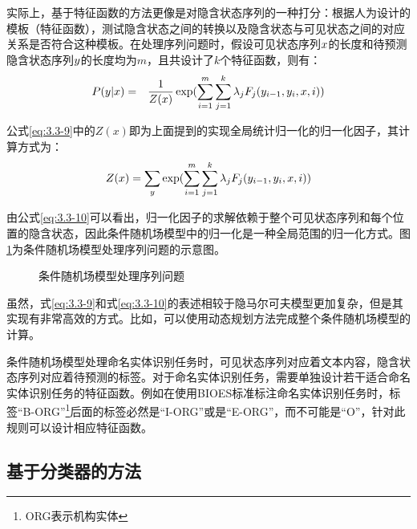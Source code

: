 \parinterval 实际上，基于特征函数的方法更像是对隐含状态序列的一种打分：根据人为设计的模板（特征函数），测试隐含状态之间的转换以及隐含状态与可见状态之间的对应关系是否符合这种模板。在处理序列问题时，假设可见状态序列${x}$的长度和待预测隐含状态序列${y}$的长度均为$m$，且共设计了$k$个特征函数，则有：
\begin{eqnarray}
{P}({y}|{x}) & = & \frac{1}{Z({x})}\exp(\sum_{i=1}^m\sum_{j=1}^{k}\lambda_{j}F_{j}(y_{i-1},y_i,{x},i))
\label{eq:3.3-9}
\end{eqnarray}

\parinterval 公式\eqref{eq:3.3-9}中的$Z(x)$即为上面提到的实现全局统计归一化的归一化因子，其计算方式为：
\begin{eqnarray}
Z({x})=\sum_{{y}}\exp(\sum_{i=1}^m\sum_{j=1}^k\lambda_{j}F_{j}(y_{i-1},y_i,{x},i))
\label{eq:3.3-10}
\end{eqnarray}

\parinterval 由公式\eqref{eq:3.3-10}可以看出，归一化因子的求解依赖于整个可见状态序列和每个位置的隐含状态，因此条件随机场模型中的归一化是一种全局范围的归一化方式。图\ref{fig:3.3-6}为条件随机场模型处理序列问题的示意图。

\begin{figure}[htp]
\centering

\caption{条件随机场模型处理序列问题}
\label{fig:3.3-6}
\end{figure}

\parinterval 虽然，式\eqref{eq:3.3-9}和式\eqref{eq:3.3-10}的表述相较于隐马尔可夫模型更加复杂，但是其实现有非常高效的方式。比如，可以使用动态规划方法完成整个条件随机场模型的计算。

\parinterval 条件随机场模型处理命名实体识别任务时，可见状态序列对应着文本内容，隐含状态序列对应着待预测的标签。对于命名实体识别任务，需要单独设计若干适合命名实体识别任务的特征函数。例如在使用BIOES标准标注命名实体识别任务时，标签“B-ORG”\footnote{ORG表示机构实体}后面的标签必然是“I-ORG”或是“E-ORG”，而不可能是“O”，针对此规则可以设计相应特征函数。


\subsection{基于分类器的方法}

